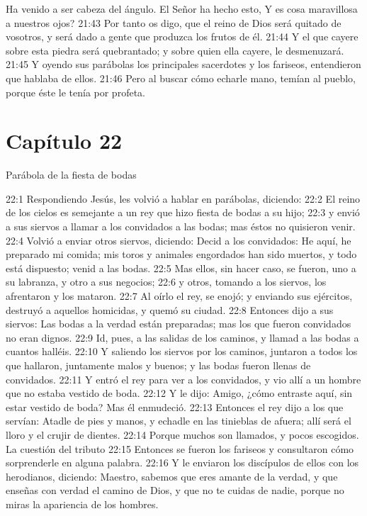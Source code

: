 Ha venido a ser cabeza del ángulo. 
El Señor ha hecho esto, 
Y es cosa maravillosa a nuestros ojos? 
21:43 Por tanto os digo, que el reino de Dios será quitado de vosotros, y será dado a gente que produzca los frutos de él. 
21:44 Y el que cayere sobre esta piedra será quebrantado; y sobre quien ella cayere, le desmenuzará. 
21:45 Y oyendo sus parábolas los principales sacerdotes y los fariseos, entendieron que hablaba de ellos. 
21:46 Pero al buscar cómo echarle mano, temían al pueblo, porque éste le tenía por profeta. 
 \section*{Capítulo 22}
Parábola de la fiesta de bodas 

22:1 Respondiendo Jesús, les volvió a hablar en parábolas, diciendo: 
22:2 El reino de los cielos es semejante a un rey que hizo fiesta de bodas a su hijo; 
22:3 y envió a sus siervos a llamar a los convidados a las bodas; mas éstos no quisieron venir. 
22:4 Volvió a enviar otros siervos, diciendo: Decid a los convidados: He aquí, he preparado mi comida; mis toros y animales engordados han sido muertos, y todo está dispuesto; venid a las bodas. 
22:5 Mas ellos, sin hacer caso, se fueron, uno a su labranza, y otro a sus negocios; 
22:6 y otros, tomando a los siervos, los afrentaron y los mataron. 
22:7 Al oírlo el rey, se enojó; y enviando sus ejércitos, destruyó a aquellos homicidas, y quemó su ciudad. 
22:8 Entonces dijo a sus siervos: Las bodas a la verdad están preparadas; mas los que fueron convidados no eran dignos. 
22:9 Id, pues, a las salidas de los caminos, y llamad a las bodas a cuantos halléis. 
22:10 Y saliendo los siervos por los caminos, juntaron a todos los que hallaron, juntamente malos y buenos; y las bodas fueron llenas de convidados. 
22:11 Y entró el rey para ver a los convidados, y vio allí a un hombre que no estaba vestido de boda. 
22:12 Y le dijo: Amigo, ¿cómo entraste aquí, sin estar vestido de boda? Mas él enmudeció. 
22:13 Entonces el rey dijo a los que servían: Atadle de pies y manos, y echadle en las tinieblas de afuera; allí será el lloro y el crujir de dientes. 
22:14 Porque muchos son llamados, y pocos escogidos. 
La cuestión del tributo  
22:15 Entonces se fueron los fariseos y consultaron cómo sorprenderle en alguna palabra. 
22:16 Y le enviaron los discípulos de ellos con los herodianos, diciendo: Maestro, sabemos que eres amante de la verdad, y que enseñas con verdad el camino de Dios, y que no te cuidas de nadie, porque no miras la apariencia de los hombres. 
